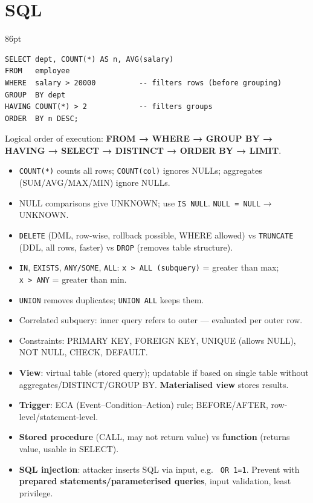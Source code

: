 \needspace{136pt}

\hypertarget{p2-04--5-sql}{%
\section{SQL}\label{p2-04--5-sql}}

\begin{listingblock}{86pt}
\begin{Verbatim}[fontsize=\fontsize{9.0}{10.9}\selectfont]
SELECT dept, COUNT(*) AS n, AVG(salary)
FROM   employee
WHERE  salary > 20000          -- filters rows (before grouping)
GROUP  BY dept
HAVING COUNT(*) > 2            -- filters groups
ORDER  BY n DESC;
\end{Verbatim}
\end{listingblock}

Logical order of execution: \textbf{FROM → WHERE → GROUP BY → HAVING → SELECT → DISTINCT → ORDER BY → LIMIT}.

\begin{itemize}
\tightlist
\item
  \texttt{COUNT(*)} counts all rows; \texttt{COUNT(col)} ignores NULLs; aggregates (SUM/AVG/MAX/MIN) ignore NULLs.
\item
  NULL comparisons give UNKNOWN; use \texttt{IS\ NULL}. \texttt{NULL\ =\ NULL} → UNKNOWN.
\item
  \texttt{DELETE} (DML, row-wise, rollback possible, WHERE allowed) vs \texttt{TRUNCATE} (DDL, all rows, faster) vs \texttt{DROP} (removes table structure).
\item
  \texttt{IN}, \texttt{EXISTS}, \texttt{ANY/SOME}, \texttt{ALL}: \texttt{x\ \textgreater{}\ ALL\ (subquery)} = greater than max; \texttt{x\ \textgreater{}\ ANY} = greater than min.
\item
  \texttt{UNION} removes duplicates; \texttt{UNION\ ALL} keeps them.
\item
  Correlated subquery: inner query refers to outer --- evaluated per outer row.
\item
  Constraints: PRIMARY KEY, FOREIGN KEY, UNIQUE (allows NULL), NOT NULL, CHECK, DEFAULT.
\item
  \textbf{View}: virtual table (stored query); updatable if based on single table without aggregates/DISTINCT/GROUP BY. \textbf{Materialised view} stores results.
\item
  \textbf{Trigger}: ECA (Event--Condition--Action) rule; BEFORE/AFTER, row-level/statement-level.
\item
  \textbf{Stored procedure} (CALL, may not return value) vs \textbf{function} (returns value, usable in SELECT).
\item
  \textbf{SQL injection}: attacker inserts SQL via input, e.g. \texttt{\textquotesingle{}\ OR\ \textquotesingle{}1\textquotesingle{}=\textquotesingle{}1}. Prevent with \textbf{prepared statements/parameterised queries}, input validation, least privilege.
\end{itemize}

